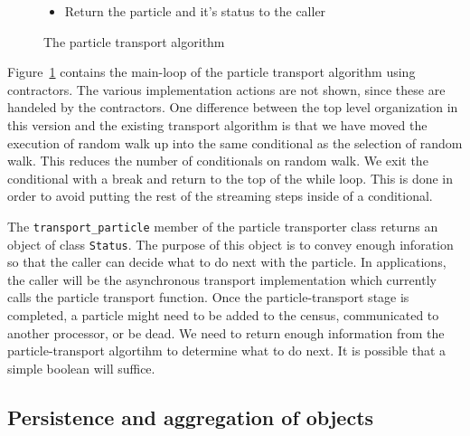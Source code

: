 \documentclass[memo]{ResearchNote}
\begin{document}
\begin{figure}[htb]
{{\begin{itemize}
\begin{itemize}
\begin{itemize}
          \item Get distance to mesh crossing $d_{\mbox{mesh}}$.
          \item Get distance to weight transition $d_{\mbox{weight}}$.
          \item Determine the smallest element of $d_{\mbox{collide}},
            d_{\mbox{census}}, d_{\mbox{mesh}}, d_{\mbox{weight}}$.
          \item Dispatch the particle to the owner of the winning
            distance.
          \item Do surface tracking check.
          \end{itemize}
        \end{itemize}
      \item Return the particle and it's status to the caller
      \end{itemize}
    }
  }
  \caption{The particle transport algorithm}
  \label{fig:particle_transport}
\end{figure}

Figure~\ref{fig:particle_transport} contains the main-loop of the
particle transport algorithm using contractors. The various
implementation actions are not shown, since these are handeled by the
contractors. One difference between the top level organization in this
version and the existing transport algorithm is that we have moved the
execution of random walk up into the same conditional as the selection
of random walk. This reduces the number of conditionals on random
walk. We exit the conditional with a break and return to the top of
the while loop. This is done in order to avoid putting the rest of the
streaming steps inside of a conditional.

The {\tt transport\_particle} member of the particle transporter class
returns an object of class {\tt Status}. The purpose of this object is
to convey enough inforation so that the caller can decide what to do
next with the particle. In applications, the caller will be the
asynchronous transport implementation which currently calls the
particle transport function. Once the particle-transport stage is
completed, a particle might need to be added to the census,
communicated to another processor, or be dead. We need to return
enough information from the particle-transport algortihm to determine
what to do next. It is possible that a simple boolean will suffice.

\subsection{Persistence and aggregation of objects}
\end{document}
